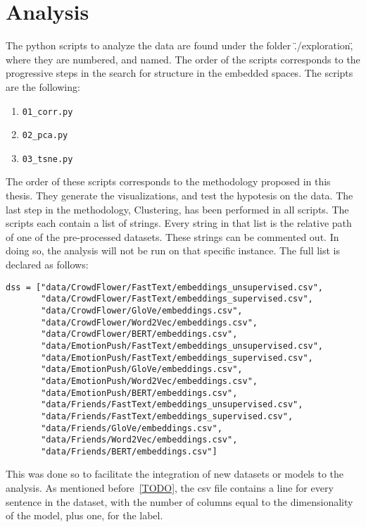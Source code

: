 \section{Analysis}\label{sec:Analysis}
The python scripts to analyze the data are found under the folder \"./exploration\", %
where they are numbered, and named. The order of the scripts corresponds to the progressive steps in the search for structure in the embedded spaces. The scripts are the following:

\begin{enumerate}
  \item \lstinline{01_corr.py}
  \item \lstinline{02_pca.py}
  \item \lstinline{03_tsne.py}
\end{enumerate}

The order of these scripts corresponds to the methodology proposed in this thesis. They generate the visualizations, and test the hypotesis on the data. The last step in the methodology, Clustering, has been performed in all scripts. The scripts each contain a list of strings. Every string in that list is the relative path of one of the pre-processed datasets. These strings can be commented out. In doing so, the analysis will not be run on that specific instance. The full list is declared as follows:

\begin{lstlisting}[caption={Pre-processed datasets},label=lst:datasets,frame=single]
dss = ["data/CrowdFlower/FastText/embeddings_unsupervised.csv",
       "data/CrowdFlower/FastText/embeddings_supervised.csv",
       "data/CrowdFlower/GloVe/embeddings.csv",
       "data/CrowdFlower/Word2Vec/embeddings.csv",
       "data/CrowdFlower/BERT/embeddings.csv",
       "data/EmotionPush/FastText/embeddings_unsupervised.csv",
       "data/EmotionPush/FastText/embeddings_supervised.csv",
       "data/EmotionPush/GloVe/embeddings.csv",
       "data/EmotionPush/Word2Vec/embeddings.csv",
       "data/EmotionPush/BERT/embeddings.csv",
       "data/Friends/FastText/embeddings_unsupervised.csv",
       "data/Friends/FastText/embeddings_supervised.csv",
       "data/Friends/GloVe/embeddings.csv",
       "data/Friends/Word2Vec/embeddings.csv",
       "data/Friends/BERT/embeddings.csv"]
\end{lstlisting}

This was done so to facilitate the integration of new datasets or models to the analysis.
As mentioned before~\ref{TODO}, the csv file contains a line for every sentence in the dataset, with the number of columns equal to the dimensionality of the model, plus one, for the label.

